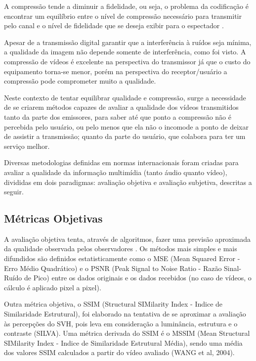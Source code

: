 A compressão tende a diminuir a fidelidade, ou seja, o problema da codificação é encontrar um equilíbrio entre o nível de compressão necessário para transmitir pelo canal e o nível de fidelidade que se deseja exibir para o espectador \cite{daronco}.

Apesar de a transmissão digital garantir que a interferência à ruídos seja mínima, a qualidade da imagem não depende somente de interferência, como foi visto. A compressão de vídeos é excelente na perspectiva do transmissor já que o custo do equipamento torna-se menor, porém na perspectiva do receptor/usuário a compressão pode comprometer muito a qualidade.

Neste contexto de tentar equilibrar qualidade e compressão, surge a necessidade de se criarem métodos capazes de avaliar a qualidade dos vídeos transmitidos tanto da parte dos emissores, para saber até que ponto a compressão não é percebida pelo usuário, ou pelo menos que ela não o incomode a ponto de deixar de assistir a transmissão; quanto da parte do usuário, que colabora para ter um serviço melhor.

Diversas metodologias definidas em normas internacionais foram criadas para avaliar a qualidade da informação multimídia (tanto áudio quanto vídeo), divididas em dois paradigmas: avaliação objetiva e avaliação subjetiva, descritas a seguir.

\subsection{Métricas Objetivas}

A avaliação objetiva tenta, através de algoritmos, fazer uma previsão aproximada da qualidade observada pelos observadores \cite{albini}. Os métodos mais simples e mais difundidos são definidos estatisticamente como o MSE (Mean Squared Error - Erro Médio Quadrático) e o PSNR (Peak Signal to Noise Ratio - Razão Sinal-Ruído de Pico) \cite{emmersonsilva} entre os dados originais e os dados recebidos (no caso de vídeos, o cálculo é aplicado pixel a pixel).

Outra métrica objetiva, o SSIM (Structural SIMilarity Index - Indice de Similaridade Estrutural), foi elaborado na tentativa de se aproximar a avaliação às percepções do SVH, pois leva em consideração a luminância, estrutura e o contraste (SILVA). Uma métrica derivada do SSIM é o MSSIM (Mean Structural SIMilarity Index - Indice de Similaridade Estrutural Média), sendo uma média dos valores SSIM calculados a partir do vídeo avaliado (WANG et al, 2004).

